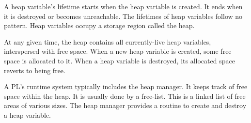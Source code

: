 \documentclass[a4paper, openany]{memoir}
\begin{document}

A heap variable's lifetime starts when the heap variable is created. It ends when it is destroyed or becomes unreachable. The lifetimes of heap variables follow no pattern. Heap variables occupy a storage region called the heap. 

At any given time, the heap contains all currently-live heap variables, interspersed with free space. When a new heap variable is created, some free space is allocated to it. When a heap variable is destroyed, its allocated space reverts to being free.

A PL's runtime system typically includes the heap manager. It keeps track of free space within the heap. It is usually done by a free-list. This is a linked list of free areas of various sizes. The heap manager provides a routine to create and destroy a heap variable.
\end{document}
